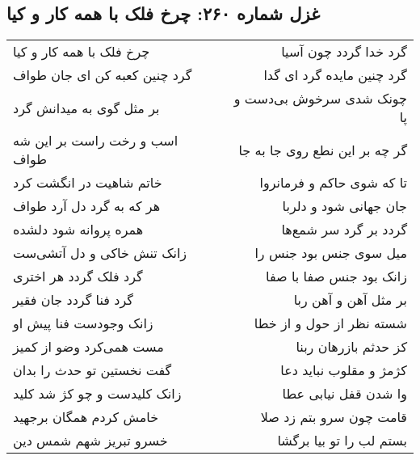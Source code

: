 \begin{center}
\section*{غزل شماره ۲۶۰: چرخ فلک با همه کار و کیا}
\label{sec:0260}
\begin{longtable}{l p{0.5cm} r}
چرخ فلک با همه کار و کیا
&&
گرد خدا گردد چون آسیا
\\
گرد چنین کعبه کن ای جان طواف
&&
گرد چنین مایده گرد ای گدا
\\
بر مثل گوی به میدانش گرد
&&
چونک شدی سرخوش بی‌دست و پا
\\
اسب و رخت راست بر این شه طواف
&&
گر چه بر این نطع روی جا به جا
\\
خاتم شاهیت در انگشت کرد
&&
تا که شوی حاکم و فرمانروا
\\
هر که به گرد دل آرد طواف
&&
جان جهانی شود و دلربا
\\
همره پروانه شود دلشده
&&
گردد بر گرد سر شمع‌ها
\\
زانک تنش خاکی و دل آتشی‌ست
&&
میل سوی جنس بود جنس را
\\
گرد فلک گردد هر اختری
&&
زانک بود جنس صفا با صفا
\\
گرد فنا گردد جان فقیر
&&
بر مثل آهن و آهن ربا
\\
زانک وجودست فنا پیش او
&&
شسته نظر از حول و از خطا
\\
مست همی‌کرد وضو از کمیز
&&
کز حدثم بازرهان ربنا
\\
گفت نخستین تو حدث را بدان
&&
کژمژ و مقلوب نباید دعا
\\
زانک کلیدست و چو کژ شد کلید
&&
وا شدن قفل نیابی عطا
\\
خامش کردم همگان برجهید
&&
قامت چون سرو بتم زد صلا
\\
خسرو تبریز شهم شمس دین
&&
بستم لب را تو بیا برگشا
\\
\end{longtable}
\end{center}

